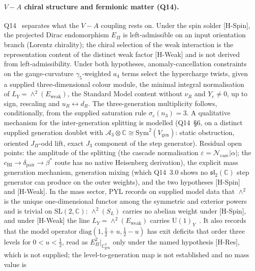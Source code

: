 \documentclass[11pt,a4paper]{article}
\providecommand{\SL}{\mathrm{SL}}
\begin{document}
  \paragraph{$V-A$ chiral structure and fermionic matter (Q14).}
    Q14~\cite{Beau2026q14} separates what the $V{-}A$ coupling rests on.
    Under the spin solder [H-Spin], the projected Dirac endomorphism $E_\Pi$ is left-admissible on an input
    orientation branch (Lorentz chirality); the chiral selection of the weak interaction is the
    representation content of the distinct weak factor [H-Weak] and is not derived from left-admissibility.
    Under both hypotheses, anomaly-cancellation constraints on the gauge-curvature $\gamma_5$-weighted $a_4$
    terms select the hypercharge twists, given a supplied three-dimensional colour module, the minimal integral
    normalisation of $L_Y = \wedge^2(E_{\mathrm{weak}})$, the Standard Model content without $\nu_R$ and $Y_e \neq 0$,
    up to sign, rescaling and $u_R \leftrightarrow d_R$.
    The three-generation multiplicity follows, conditionally, from the supplied saturation rule
    $\sigma_c(n_3) = 3$.
    A qualitative mechanism for the inter-generation splitting is modelled (Q14~\S6, on a distinct supplied
    generation doublet with $\mathcal{A}_3 \otimes \mathbb{C} \cong \mathrm{Sym}^2(V_{\mathrm{gen}})$:
    static obstruction, oriented $J_\Pi$-odd lift, exact $J_3$ component of the step generator).
    Residual open points: the amplitude of the splitting (the cascade normalisation
    $\varepsilon = \mathcal{N}_{\mathrm{casc}}|\alpha|$; the
    $c_{\mathrm{BI}} \to \delta_{\mathrm{pair}} \to \beta^*$ route has no native Heisenberg
    derivation), the explicit mass generation mechanism,
    generation mixing (which Q14~3.0 shows no $\mathfrak{sl}_2(\mathbb{C})$ step generator can produce on the
    outer weights), and the two hypotheses [H-Spin] and [H-Weak].
    In the mass sector, PYL records on supplied model data that $\wedge^2$ is the unique one-dimensional functor
    among the symmetric and exterior powers and is trivial on $\SL(2,\mathbb{C})$: $\wedge^2(S_L)$ carries no abelian
    weight under [H-Spin], and under [H-Weak] the line $L_Y = \wedge^2(E_{\mathrm{weak}})$ carries
    $\mathrm{U}(1)_Y$~\cite{Beau2026pyl}.
    It also records that the model operator $\mathrm{diag}(1, \tfrac12+u, \tfrac12-u)$ has exit deficits that order
    three levels for $0 < u < \tfrac12$, read as $E_\Pi^2|_{\mathbb{C}^3_{\mathrm{gen}}}$ only under the named
    hypothesis [H-Res], which is not supplied; the level-to-generation map is not established and no mass value is
\end{document}
